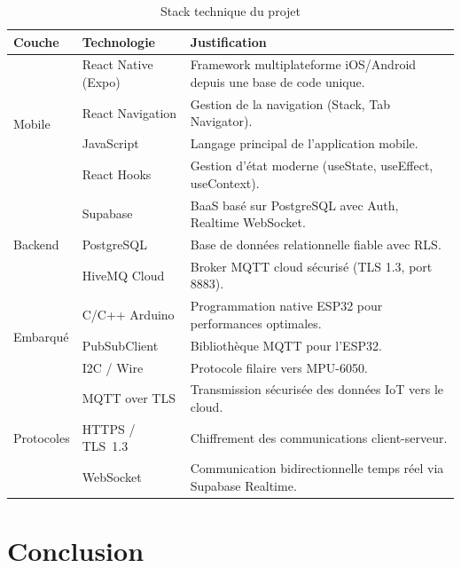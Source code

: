 \documentclass[12pt, a4paper]{report}
\begin{document}
\begin{table}[H]
  \centering
  \caption{Stack technique du projet}
  \label{tab:stack}
  \renewcommand{\arraystretch}{1.4}
  \small
  \begin{tabularx}{\textwidth}{|p{2.5cm}|p{3.5cm}|X|}
    \hline
    \rowcolor{isimablue!20}
    \textbf{Couche} & \textbf{Technologie} & \textbf{Justification} \\
    \hline
    \multirow{4}{*}{Mobile}
      & React Native (Expo)  & Framework multiplateforme iOS/Android depuis une base de code unique. \\
    \cline{2-3}
      & React Navigation     & Gestion de la navigation (Stack, Tab Navigator). \\
    \cline{2-3}
      & JavaScript           & Langage principal de l'application mobile. \\
    \cline{2-3}
      & React Hooks          & Gestion d'état moderne (useState, useEffect, useContext). \\
    \hline
    \multirow{3}{*}{Backend}
      & Supabase             & BaaS basé sur PostgreSQL avec Auth, Realtime WebSocket. \\
    \cline{2-3}
      & PostgreSQL           & Base de données relationnelle fiable avec RLS. \\
    \cline{2-3}
      & HiveMQ Cloud         & Broker MQTT cloud sécurisé (TLS 1.3, port 8883). \\
    \hline
    \multirow{3}{*}{Embarqué}
      & C/C++ Arduino        & Programmation native ESP32 pour performances optimales. \\
    \cline{2-3}
      & PubSubClient         & Bibliothèque MQTT pour l'ESP32. \\
    \cline{2-3}
      & I2C / Wire           & Protocole filaire vers MPU-6050. \\
    \hline
    \multirow{3}{*}{Protocoles}
      & MQTT over TLS        & Transmission sécurisée des données IoT vers le cloud. \\
    \cline{2-3}
      & HTTPS / TLS~1.3      & Chiffrement des communications client-serveur. \\
    \cline{2-3}
      & WebSocket            & Communication bidirectionnelle temps réel via Supabase Realtime. \\
    \hline
  \end{tabularx}
\end{table}

\section*{Conclusion}
\end{document}

